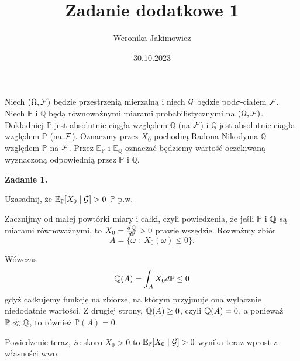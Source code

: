 \documentclass{article}
\title{Zadanie dodatkowe 1}
\author{Weronika Jakimowicz}
\date{30.10.2023}
\newcommand{\E}{\mathbb{E}}
\renewcommand{\P}{\mathbb{P}}
\begin{document}
\maketitle
\thispagestyle{empty}

Niech $(\Omega,\mathcal{F})$ będzie przestrzenią mierzalną i niech $\mathcal{G}$ będzie pod$\sigma$-ciałem $\mathcal{F}$. Niech $\P$ i $\mathbb{Q}$ będą równoważnymi miarami probabilistycznymi na $(\Omega,\mathcal{F})$. Dokładniej $\P$ jest absolutnie ciągła względem $\mathbb{Q}$ (na $\mathcal{F}$) i $\mathbb{Q}$ jest absolutnie ciągła względem $\P$ (na $\mathcal{F}$). Oznaczmy przez $X_0$ pochodną Radona-Nikodyma $\mathbb{Q}$ względem $\P$ na $\mathcal{F}$. Przez $\mathbb{E}_\P$ i $\mathbb{E}_{\mathbb{Q}}$ oznaczać będziemy wartość oczekiwaną wyznaczoną odpowiednią przez $\P$ i $\mathbb{Q}$.
\bigskip

{\bfseries{\large\color{orange}Zadanie 1.}

  Uzasadnij, że $\mathbb{E}_\mathbb{P}[X_0\;|\;\mathcal{G}]>0$ $\P$-p.w.
}
\medskip

Zacznijmy od małej powtórki miary i całki, czyli powiedzenia, że jeśli $\P$ i $\operatorname{\mathbb{Q}}$ są miarami równoważnymi, to $X_0=\frac{d\Q}{d\P}>0$ prawie wszędzie. Rozważmy zbiór 
$$A=\{\omega\;:\;X_0(\omega)\leq 0\}.$$

Wówczas
$$\Q(A)=\int_A X_0d\P\leq 0$$
gdyż całkujemy funkcję na zbiorze, na którym przyjmuje ona wyłącznie niedodatnie wartości. Z drugiej strony, $\operatorname{\mathbb{Q}}(A)\geq 0$, czyli $\operatorname{\mathbb{Q}}(A)=0$, a ponieważ $\P\ll \Q$, to również $\P(A)=0$.

Powiedzenie teraz, że skoro $X_0>0$ to $\E_{\P}[X_0\;|\;\set{G}]>0$ wynika teraz wprost z własności wwo.


%
\bigskip
\end{document}

